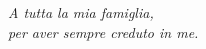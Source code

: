 \thispagestyle{empty}
\vspace*{6cm}
\begin{flushright}
    \large \em
    A tutta la mia famiglia, \\
    per aver sempre creduto in me.
\end{flushright}